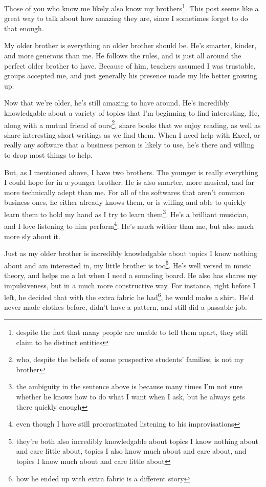 \documentclass[12pt]{article}[titlepage]
\newcommand{\1}{\={a}}
\newcommand{\2}{\={e}}
\newcommand{\3}{\={\i}}
\newcommand{\4}{\=o}
\newcommand{\5}{\=u}
\newcommand{\6}{\={A}}
\renewcommand{\,}{\textsuperscript{,}}
\begin{document}
\doublespacing
Those of you who know me likely also know my brothers\footnote{despite the fact that many people are unable to tell them apart, they still claim to be distinct entities}. This post seems like a great way to talk about how amazing they are, since I sometimes forget to do that enough.

My older brother is everything an older brother should be. He's smarter, kinder, and more generous than me. He follows the rules, and is just all around the perfect older brother to have. Because of him, teachers assumed I was trustable, groups accepted me, and just generally his presence made my life better growing up.

Now that we're older, he's still amazing to have around. He's incredibly knowledgable about a variety of topics that I'm beginning to find interesting. He, along with a mutual friend of ours\footnote{ who, despite the beliefs of some prospective students' families, is not my brother}, share books that we enjoy reading, as well as share interesting short writings as we find them. When I need help with Excel, or really any software that a business person is likely to use, he's there and willing to drop most things to help.

But, as I mentioned above, I have two brothers. The younger is really everything I could hope for in a younger brother. He is also smarter, more musical, and far more technically adept than me. For all of the softwares that aren't common business ones, he either already knows them, or is willing and able to quickly learn them to hold my hand as I try to learn them\footnote{the ambiguity in the sentence above is because many times I'm not sure whether he knows how to do what I want when I ask, but he always gets there quickly enough}. He's a brilliant musician, and I love listening to him perform\footnote{even though I have still procrastinated listening to his improvisations}. He's much wittier than me, but also much more sly about it.

Just as my older brother is incredibly knowledgable about topics I know nothing about and am interested in, my little brother is too\footnote{they're both also incredibly knowledgable about topics I know nothing about and care little about, topics I also know much about and care about, and topics I know much about and care little about}. He's well versed in music theory, and helps me a lot when I need a sounding board. He also has shares my impulsiveness, but in a much more constructive way. For instance, right before I left, he decided that with the extra fabric he had\footnote{how he ended up with extra fabric is a different story}, he would make a shirt. He'd never made clothes before, didn't have a pattern, and still did a passable job.
\end{document}
